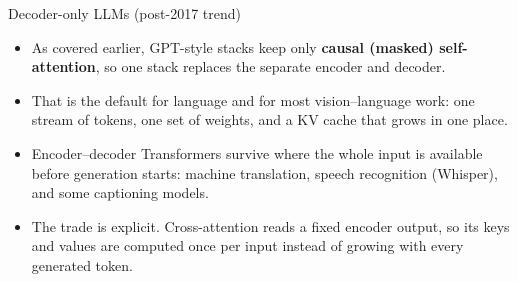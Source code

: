 \begin{frame}{Decoder-only LLMs (post-2017 trend)}
  \begin{itemize}\itemsep0.3em
    \item As covered earlier, GPT-style stacks keep only \textbf{causal (masked) self-attention}, so one stack replaces the separate encoder and decoder.
    \item That is the default for language and for most vision--language work: one stream of tokens, one set of weights, and a KV cache that grows in one place.
    \item Encoder--decoder Transformers survive where the whole input is available before generation starts: machine translation, speech recognition (Whisper), and some captioning models.
    \item The trade is explicit. Cross-attention reads a fixed encoder output, so its keys and values are computed once per input instead of growing with every generated token.
  \end{itemize}
\end{frame}
